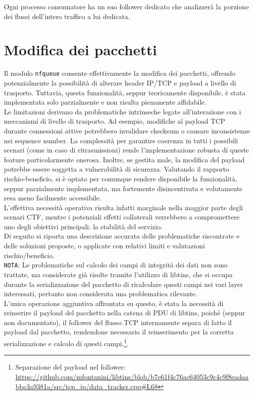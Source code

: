 Ogni processo consumatore ha un suo follower dedicato che analizzerà la porzione dei flussi dell'intero traffico a lui dedicata.

\section{Modifica dei pacchetti}

Il modulo \texttt{nfqueue} consente effettivamente la modifica dei pacchetti, offrendo potenzialmente la possibilità di alterare header
IP/TCP e payload a livello di trasporto. Tuttavia, questa funzionalità, seppur teoricamente disponibile, è stata implementata solo parzialmente e non risulta pienamente affidabile.\\
Le limitazioni derivano da problematiche intrinseche legate all’interazione con i meccanismi di livello di trasporto.
Ad esempio, modifiche al payload TCP durante connessioni attive potrebbero invalidare checksum o causare inconsistenze nei sequence number.
La complessità per garantire coerenza in tutti i possibili scenari (come in caso di ritrasmissioni) rende l’implementazione robusta di queste feature
particolarmente onerosa. Inoltre, se gestita male, la modifica del payload potrebbe essere soggetta a vulnerabilità di sicurezza.
Valutando il rapporto rischio-beneficio, si è optato per comunque rendere disponibile la funzionalità, seppur parzialmente implementata, 
ma fortemente disincentivata e volutamente resa meno facilmente accessibile.\\
L’effettiva necessità operativa risulta infatti marginale nella maggior parte degli scenari CTF, mentre i potenziali effetti collaterali verrebbero
a compromettere uno degli obiettivi principali: la stabilità del servizio.\\

Di seguito si riporta una descrizione accurata delle problematiche riscontrate e delle soluzioni proposte, o applicate con relativi limiti e valutazioni rischio/beneficio.\\

\texttt{NOTA}: Le problematiche sul calcolo dei campi di integrità dei dati non sono trattate, ma considerate già risolte tramite l'utilizzo di libtins, che si occupa durante la serializzazione
del pacchetto di ricalcolare questi campi nei vari layer interessati, pertanto non considerata una problematica rilevante.\\
L'unica operazione aggiuntiva affrontata su questo, è stata la necessità di reinserire il payload del pacchetto nella catena di PDU di libtins,
poiché (seppur non documentato), il follower del flusso TCP internamente separa di fatto il payload dal pacchetto, rendendone necessario il reinserimento per la
corretta serializzazione e calcolo di questi campi.\footnote{Separazione del payload nel follower: \url{https://github.com/mfontanini/libtins/blob/b7e61f4c76ac64053c9c4c9f8eadaabbe3a9381a/src/tcp_ip/data_tracker.cpp\#L68}}.\\

